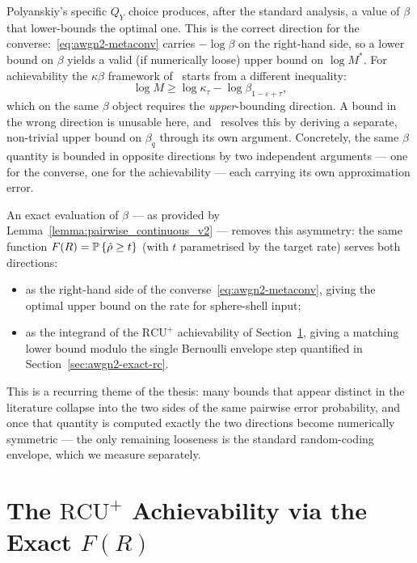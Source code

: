 Polyanskiy's specific $Q_Y$ choice produces, after the standard analysis, a value of $\beta$ that lower-bounds the optimal one.  This is the correct direction for the converse:~\eqref{eq:awgn2-metaconv} carries $-\log\beta$ on the right-hand side, so a lower bound on $\beta$ yields a valid (if numerically loose) upper bound on $\log M^*$.  For achievability the $\kappa\beta$ framework of~\cite{polyanskiy2010channel} starts from a different inequality:
\begin{equation}\label{eq:awgn2-kappabeta}
	\log M \geq \log\kappa_\tau - \log\beta_{1-\varepsilon+\tau},
\end{equation}
which on the same $\beta$ object requires the \emph{upper}-bounding direction.  A bound in the wrong direction is unusable here, and~\cite{polyanskiy2010channel} resolves this by deriving a separate, non-trivial upper bound on $\beta_q$ through its own argument.  Concretely, the same $\beta$ quantity is bounded in opposite directions by two independent arguments --- one for the converse, one for the achievability --- each carrying its own approximation error.

An exact evaluation of $\beta$ --- as provided by Lemma~\ref{lemma:pairwise_continuous_v2} --- removes this asymmetry: the same function $F(R) = \mathbb{P}\left\{ \hat\rho \ge t \right\}$ (with $t$ parametrised by the target rate) serves both directions:
\begin{itemize}
	\item as the right-hand side of the converse~\eqref{eq:awgn2-metaconv}, giving the optimal upper bound on the rate for sphere-shell input;
	\item as the integrand of the $\mathrm{RCU}^+$ achievability of Section~\ref{sec:awgn2-rcu}, giving a matching lower bound modulo the single Bernoulli envelope step quantified in Section~\ref{sec:awgn2-exact-rc}.
\end{itemize}
This is a recurring theme of the thesis: many bounds that appear distinct in the literature collapse into the two sides of the same pairwise error probability, and once that quantity is computed exactly the two directions become numerically symmetric --- the only remaining looseness is the standard random-coding envelope, which we measure separately.

\section{The $\mathrm{RCU}^+$ Achievability via the Exact $F(R)$}
\label{sec:awgn2-rcu}

